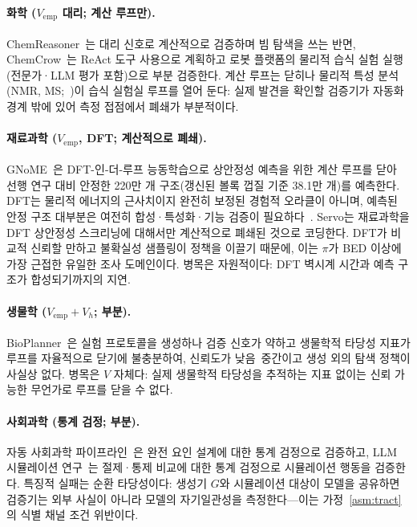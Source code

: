 \documentclass[11pt]{article}
\begin{document}
\paragraph{화학 ($V_\text{emp}$ 대리; 계산 루프만).} ChemReasoner~\citep{sprueill2024chemreasoner}는 대리 신호로 계산적으로 검증하며 빔 탐색을 쓰는 반면, ChemCrow~\citep{bran2023chemcrow}는 ReAct 도구 사용으로 계획하고 로봇 플랫폼의 물리적 습식 실험 실행(전문가·LLM 평가 포함)으로 부분 검증한다. 계산 루프는 닫히나 물리적 특성 분석(NMR, MS;~\citep{kamber2026chemist})이 습식 실험실 루프를 열어 둔다: 실제 발견을 확인할 검증기가 자동화 경계 밖에 있어 측정 접점에서 폐쇄가 부분적이다.

\paragraph{재료과학 ($V_\text{emp}$, DFT; 계산적으로 폐쇄).} GNoME~\citep{merchant2023gnome}은 DFT-인-더-루프 능동학습으로 상안정성 예측을 위한 계산 루프를 닫아 선행 연구 대비 안정한 220만 개 구조(갱신된 볼록 껍질 기준 38.1만 개)를 예측한다. DFT는 물리적 에너지의 근사치이지 완전히 보정된 경험적 오라클이 아니며, 예측된 안정 구조 대부분은 여전히 합성·특성화·기능 검증이 필요하다~\citep{cheetham2024gnome}. Servo는 재료과학을 DFT 상안정성 스크리닝에 대해서만 계산적으로 폐쇄된 것으로 코딩한다. DFT가 비교적 신뢰할 만하고 불확실성 샘플링이 정책을 이끌기 때문에, 이는 $\pi$가 BED 이상에 가장 근접한 유일한 조사 도메인이다. 병목은 자원적이다: DFT 벽시계 시간과 예측 구조가 합성되기까지의 지연.

\paragraph{생물학 ($V_\text{emp}+V_h$; 부분).} BioPlanner~\citep{odonoghue2023bioplanner}은 실험 프로토콜을 생성하나 검증 신호가 약하고 생물학적 타당성 지표가 루프를 자율적으로 닫기에 불충분하여, 신뢰도가 낮음~중간이고 생성 외의 탐색 정책이 사실상 없다. 병목은 $V$ 자체다: 실제 생물학적 타당성을 추적하는 지표 없이는 신뢰 가능한 무언가로 루프를 닫을 수 없다.

\paragraph{사회과학 (통계 검정; 부분).} 자동 사회과학 파이프라인~\citep{manning2024automated}은 완전 요인 설계에 대한 통계 검정으로 검증하고, LLM 시뮬레이션 연구~\citep{aher2023turing,park2023generative}는 절제·통제 비교에 대한 통계 검정으로 시뮬레이션 행동을 검증한다. 특징적 실패는 순환 타당성이다: 생성기 $G$와 시뮬레이션 대상이 모델을 공유하면 검증기는 외부 사실이 아니라 모델의 자기일관성을 측정한다---이는 가정~\ref{asm:tract}의 식별 채널 조건 위반이다.
\end{document}
